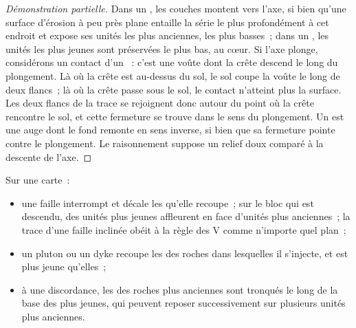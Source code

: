 \begin{proof}[Démonstration partielle]
Dans un , les couches montent vers l'axe, si bien qu'une surface
d'érosion à peu près plane entaille la série le plus profondément à cet endroit
et expose ses unités les plus anciennes, les plus basses~; dans un ,
les unités les plus jeunes sont préservées le plus bas, au cœur. Si l'axe
plonge, considérons un contact d'un ~: c'est une voûte dont la crête
descend le long du plongement. Là où la crête est au-dessus du sol, le sol coupe
la voûte le long de deux flancs~; là où la crête passe sous le sol, le contact
n'atteint plus la surface. Les deux flancs de la trace se rejoignent donc autour
du point où la crête rencontre le sol, et cette fermeture se trouve dans le sens
du plongement. Un  est une auge dont le fond remonte en sens inverse,
si bien que sa fermeture pointe contre le plongement. Le raisonnement suppose un
relief doux comparé à la descente de l'axe.
\end{proof}

\begin{proposition}\label{prop:b1:geological-maps:cuts}
Sur une carte~:
\begin{itemize}
  \item une faille interrompt et décale les  qu'elle recoupe~; sur le
        bloc qui est descendu, des unités plus jeunes affleurent en face d'unités
        plus anciennes~; la trace d'une faille inclinée obéit à la règle des V
        comme n'importe quel plan~;
  \item un pluton ou un dyke recoupe les  des roches dans lesquelles il
        s'injecte, et est plus jeune qu'elles~;
  \item à une discordance, les  des roches plus anciennes sont tronqués
        le long de la base des plus jeunes, qui peuvent reposer successivement
        sur plusieurs unités plus anciennes.
\end{itemize}
\end{proposition}

